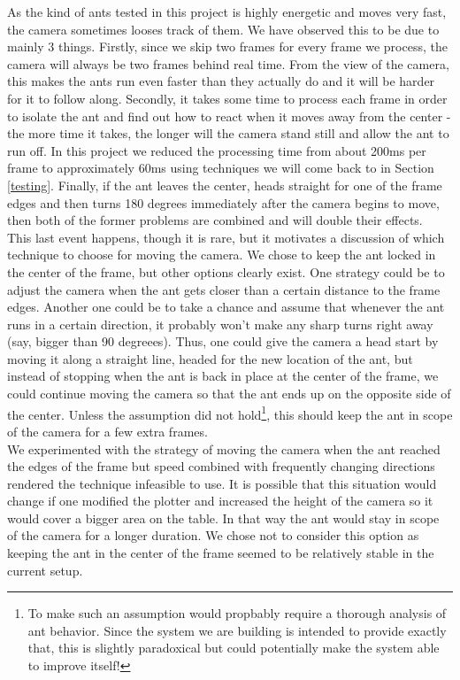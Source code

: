 As the kind of ants tested in this project is highly energetic and moves very fast, the camera sometimes looses track of them. We have observed this to be due to mainly 3 things. Firstly, since we skip two frames for every frame we process, the camera will always be two frames behind real time. From the view of the camera, this makes the ants run even faster than they actually do and it will be harder for it to follow along. Secondly, it takes some time to process each frame in order to isolate the ant and find out how to react when it moves away from the center - the more time it takes, the longer will the camera stand still and allow the ant to run off. In this project we reduced the processing time from about 200ms per frame to approximately 60ms using techniques we will come back to in Section \ref{testing}. Finally, if the ant leaves the center, heads straight for one of the frame edges and then turns 180 degrees immediately after the camera begins to move, then both of the former problems are combined and will double their effects. \\

This last event happens, though it is rare, but it motivates a discussion of which technique to choose for moving the camera. We chose to keep the ant locked in the center of the frame, but other options clearly exist. One strategy could be to adjust the camera when the ant gets closer than a certain distance to the frame edges. Another one could be to take a chance and assume that whenever the ant runs in a certain direction, it probably won't make any sharp turns right away (say, bigger than 90 degreees). Thus, one could give the camera a head start by moving it along a straight line, headed for the new location of the ant, but instead of stopping when the ant is back in place at the center of the frame, we could continue moving the camera so that the ant ends up on the opposite side of the center. Unless the assumption did not hold\footnote{To make such an assumption would propbably require a thorough analysis of ant behavior. Since the system we are building is intended to provide exactly that, this is slightly paradoxical but could potentially make the system able to improve itself!}, this should keep the ant in scope of the camera for a few extra frames. \\

We experimented with the strategy of moving the camera when the ant reached the edges of the frame but speed combined with frequently changing directions rendered the technique infeasible to use. It is possible that this situation would change if one modified the plotter and increased the height of the camera so it would cover a bigger area on the table. In that way the ant would stay in scope of the camera for a longer duration. We chose not to consider this option as keeping the ant in the center of the frame seemed to be relatively stable in the current setup.

